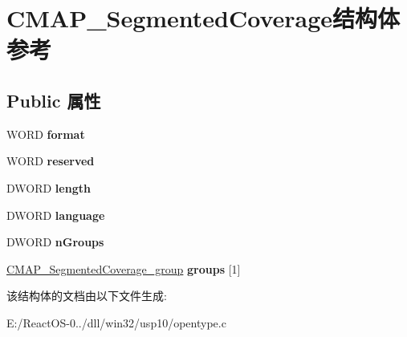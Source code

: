 \hypertarget{struct_c_m_a_p___segmented_coverage}{}\section{C\+M\+A\+P\+\_\+\+Segmented\+Coverage结构体 参考}
\label{struct_c_m_a_p___segmented_coverage}
\subsection*{Public 属性}
\begin{DoxyCompactItemize}
\item 
\mbox{\label{struct_c_m_a_p___segmented_coverage_ae4d2e1d557d5f044650d465b3b241b40}} 
W\+O\+RD {\bfseries format}
\item 
\mbox{\label{struct_c_m_a_p___segmented_coverage_adcac08426f5de4deec5c1f15869746eb}} 
W\+O\+RD {\bfseries reserved}
\item 
\mbox{\label{struct_c_m_a_p___segmented_coverage_a2025c4fc0723bfc8556e03556aa67c5c}} 
D\+W\+O\+RD {\bfseries length}
\item 
\mbox{\label{struct_c_m_a_p___segmented_coverage_a97142f5ebce359783a8712f10aea4be5}} 
D\+W\+O\+RD {\bfseries language}
\item 
\mbox{\label{struct_c_m_a_p___segmented_coverage_a0d123748a30a9eabdcb633556bc0487e}} 
D\+W\+O\+RD {\bfseries n\+Groups}
\item 
\mbox{\label{struct_c_m_a_p___segmented_coverage_afbc9ef9fdd30977fffd82eef7cc66423}} 
\hyperlink{struct_c_m_a_p___segmented_coverage__group}{C\+M\+A\+P\+\_\+\+Segmented\+Coverage\+\_\+group} {\bfseries groups} \mbox{[}1\mbox{]}
\end{DoxyCompactItemize}


该结构体的文档由以下文件生成\+:\begin{DoxyCompactItemize}
\item 
E\+:/\+React\+O\+S-\/0../dll/win32/usp10/opentype.\+c\end{DoxyCompactItemize}
